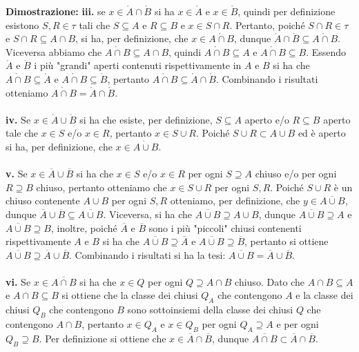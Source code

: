 \documentclass{article}
\begin{document}
\textbf{Dimostrazione:} \textbf{iii.} se $x \in \mathring{A} \cap \mathring{B}$ si ha $x \in \mathring{A}$ e $x \in \mathring{B}$, quindi per definizione esistono $S, R \in \tau$ tali che $S \subseteq A$ e $R \subseteq B$ e $x \in S \cap R$. Pertanto, poiché $S \cap R \in \tau$ e $S \cap R \subseteq A \cap B$, si ha, per definizione, che $x \in \mathring{A \cap B}$, dunque $\mathring{A} \cap \mathring{B} \subseteq \mathring{A \cap B}$. Viceversa abbiamo che $\mathring{A \cap B} \subseteq A \cap B$, quindi $\mathring{A \cap B} \subseteq A$ e $\mathring{A \cap B} \subseteq B$. Essendo $\mathring{A}$ e $\mathring{B}$ i più "grandi" aperti contenuti rispettivamente in $A$ e $B$ si ha che $\mathring{A \cap B} \subseteq \mathring{A}$ e $\mathring{A \cap B} \subseteq \mathring{B}$, pertanto $\mathring{A \cap B} \subseteq \mathring{A} \cap \mathring{B}$. Combinando i risultati otteniamo $\mathring{A \cap B} = \mathring{A} \cap \mathring{B}$. \\ \\
\textbf{iv.} Se $x \in \mathring{A} \cup \mathring{B}$ si ha che esiste, per definizione, $S \subseteq A$ aperto e/o $R \subseteq B$ aperto tale che $x \in S$ e/o $x \in R$, pertanto $x \in S \cup R$. Poiché $S \cup R \subset A \cup B$ ed è aperto si ha, per definizione, che $x \in \mathring{A \cup B}$. \\ \\
\textbf{v.} Se $x \in \overline{A} \cup \overline{B}$ si ha che $x \in S$ e/o $x \in R$ per ogni $S \supseteq A$ chiuso e/o per ogni $R \supseteq B$ chiuso, pertanto otteniamo che $x \in S \cup R$ per ogni $S, R$. Poiché $S \cup R$ è un chiuso contenente $A \cup B$ per ogni $S, R$ otteniamo, per definizione, che $y \in \overline{A \cup B}$, dunque $\overline{A} \cup \overline{B} \subseteq \overline{A \cup B}$. Viceversa, si ha che $\overline{A \cup B} \supseteq A \cup B$, dunque $\overline{A \cup B} \supseteq A$ e $\overline{A \cup B} \supseteq B$, inoltre, poiché $\overline{A}$ e $\overline{B}$ sono i più "piccoli" chiusi contenenti rispettivamente $A$ e $B$ si ha che $\overline{A \cup B} \supseteq \overline{A}$ e $\overline{A \cup B} \supseteq \overline{B}$, pertanto si ottiene $\overline{A \cup B} \supseteq \overline{A} \cup \overline{B}$. Combinando i risultati si ha la tesi: $\overline{A \cup B} = \overline{A} \cup \overline{B}$. \\ \\
\textbf{vi.} Se $x \in \overline{A \cap B}$ si ha che $x \in Q$ per ogni $Q \supseteq A \cap B$ chiuso. Dato che $A \cap B \subseteq A$ e $A \cap B \subseteq B$ si ottiene che la classe dei chiusi $Q_A$ che contengono $A$ e la classe dei chiusi $Q_B$ che contengono $B$ sono sottoinsiemi della classe dei chiusi $Q$ che contengono $A \cap B$, pertanto $x \in Q_A$ e $x \in Q_B$ per ogni $Q_A \supseteq A$ e per ogni $Q_B \supseteq B$. Per definizione si ottiene che $x \in \overline{A} \cap \overline{B}$, dunque $\overline{A \cap B} \subset \overline{A} \cap \overline{B}$. \\ \\
\end{document}
